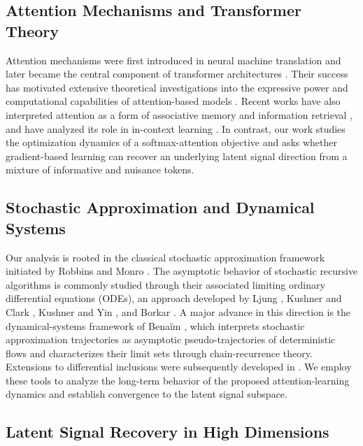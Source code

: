 \documentclass[11pt,a4paper]{article}
\theoremstyle{definition}
\begin{document}
\subsection{Attention Mechanisms and Transformer Theory}

Attention mechanisms were first introduced in neural machine translation
\cite{bahdanau2015neural} and later became the central component of transformer architectures
\cite{vaswani2017attention}. Their success has motivated extensive theoretical investigations into the expressive power and computational capabilities of attention-based models
\cite{yun2020transformers,perez2019turing,likhosherstov2021expressive}.
Recent works have also interpreted attention as a form of associative memory and information retrieval
\cite{ramsauer2021hopfield}, and have analyzed its role in in-context learning  
\cite{garg2022can,vonoswald2023transformers, Cao2026TransformersLR}.
In contrast, our work studies the optimization dynamics of a softmax-attention objective and asks whether gradient-based learning can recover an underlying latent signal direction from a mixture of informative and nuisance tokens.

\subsection{Stochastic Approximation and Dynamical Systems}

Our analysis is rooted in the classical stochastic approximation framework initiated by Robbins and Monro \cite{robbins1951stochastic}. The asymptotic behavior of stochastic recursive algorithms is commonly studied through their associated limiting ordinary differential equations (ODEs), an approach developed by Ljung \cite{ljung1977analysis}, Kushner and Clark \cite{kushner1978}, Kushner and Yin \cite{kushner2003stochastic}, and Borkar \cite{borkar2023stochastic}. A major advance in this direction is the dynamical-systems framework of Bena\"im \cite{benaim1996dynamical,benaim1999dynamics}, which interprets stochastic approximation trajectories as asymptotic pseudo-trajectories of deterministic flows and characterizes their limit sets through chain-recurrence theory. Extensions to differential inclusions were subsequently developed in \cite{benaim2005stochastic}. We employ these tools to analyze the long-term behavior of the proposed attention-learning dynamics and establish convergence to the latent signal subspace.

\subsection{Latent Signal Recovery in High Dimensions}
\end{document}
